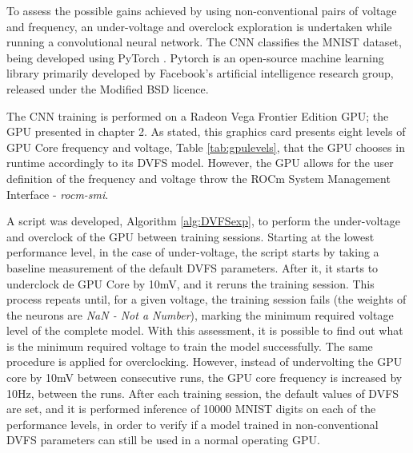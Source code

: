 To assess the possible gains achieved by using non-conventional pairs of voltage and frequency, an under-voltage and overclock exploration is undertaken while running a convolutional neural network. The CNN classifies the MNIST dataset\cite{noauthor_mnist_1999}, being developed using PyTorch \cite{noauthor_pytorch_2016}. Pytorch is an open-source machine learning library primarily developed by Facebook's artificial intelligence research group, released under the Modified BSD licence.

The CNN training is performed on a Radeon Vega Frontier Edition GPU; the GPU presented in chapter 2. As stated, this graphics card presents eight levels of GPU Core frequency and voltage, Table \ref{tab:gpulevels}, that the GPU chooses in runtime accordingly to its DVFS model. However, the GPU allows for the user definition of the frequency and voltage throw the ROCm System Management Interface - \textit{rocm-smi}. 

A script was developed, Algorithm \ref{alg:DVFSexp}, to perform the under-voltage and overclock of the GPU between training sessions. Starting at the lowest performance level, in the case of under-voltage, the script starts by taking a baseline measurement of the default DVFS parameters. After it, it starts to underclock de GPU Core by 10mV, and it reruns the training session. This process repeats until, for a given voltage, the training session fails (the weights of the neurons are \textit{NaN - Not a Number}), marking the minimum required voltage level of the complete model. With this assessment, it is possible to find out what is the minimum required voltage to train the model successfully. The same procedure is applied for overclocking. However, instead of undervolting the GPU core by 10mV between consecutive runs, the GPU core frequency is increased by 10Hz, between the runs. After each training session, the default values of DVFS are set, and it is performed inference of 10000 MNIST digits on each of the performance levels, in order to verify if a model trained in non-conventional DVFS parameters can still be used in a normal operating GPU.


